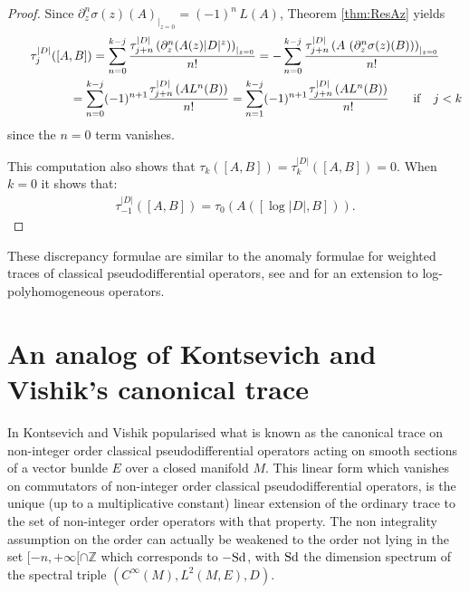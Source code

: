 \documentclass[pdftex]{sigma}
\def \Z {\mathbb Z}
\def \Ci {{C^\infty}}
\numberwithin{equation}{section}
\begin{document}
\begin{proof}
Since  $\partial^n_z \sigma(z)(A)_{\vert_{z=0}}=
(-1)^n\, L(A)$,   Theorem \ref{thm:ResAz}
    yields
\begin{gather*}
 \tau_j^{\vert D\vert}([A,B]) =  \sum_{n= 0}^{k-j} \frac{\tau_{j+n}^{\vert D\vert} \left(\partial_z^n (A(z)
  \vert D\vert^z)\right)_{\vert_{z=0}}}{n!}
 =  -\sum_{n= 0}^{k-j} \frac{\tau_{j+n}^{\vert D\vert} \left(A\, \left(\partial_z^n \sigma(z)
  (B)\right) \right)_{\vert_{z=0}}}{n!}\\
 \phantom{\tau_j^{\vert D\vert}([A,B])}{}
 =  \sum_{n= 0}^{k-j} (-1)^{n+1}\frac{\tau_{j+n}^{\vert D\vert} \left(
    A L^n(B)\right)}{n!}
 =  \sum_{n=1}^{k-j} (-1)^{n+1}\frac{\tau_{j+n}^{\vert D\vert} \left(
    A L^n(B)\right)}{n!}\qquad{\rm if}\quad j<k
    \end{gather*}
since the $n=0$ term vanishes.

  This computation also shows that $ \tau_k([A,B]) =\tau_k^{\vert D\vert} ([A,B])=0$.  When
  $k=0$ it  shows that:
\begin{gather*}
\tau_{-1}^{\vert D\vert}([A,B ])=\tau_{0}\left( A \left([ \log
    \vert D\vert ,B] \right)\right).\tag*{\qed}
    \end{gather*}\renewcommand{\qed}{}
\end{proof}

These discrepancy formulae are similar to the anomaly formulae for weighted
traces of classical  pseudodif\/ferential operators, see \cite{MN,CDMP,PS}  and
 \cite{Pa1}  for an extension  to  log-polyhomogeneous operators.


\section{ An analog of Kontsevich and Vishik's canonical trace}\label{section7}

In \cite{KV} Kontsevich and Vishik popularised what is known as the canonical trace on
non-integer order classical pseudodif\/ferential operators acting on smooth
sections of a vector bunlde $E$ over a closed manifold $
M$. This linear form
which vanishes on commutators of non-integer order classical pseudodif\/ferential
operators, is the unique (up to a multiplicative constant) linear extension of the ordinary trace to the set of
non-integer order operators with that property. The non integrality assumption
on the order can actually be weakened to  the order not lying in the set  $[{-}n,+\infty[\cap
\Z$ which corresponds to $- {\rm Sd}$, with ${\rm Sd}$ the dimension spectrum of the spectral triple
$\left(\Ci(M), L^2(M, E), D\right).$
\end{document}
